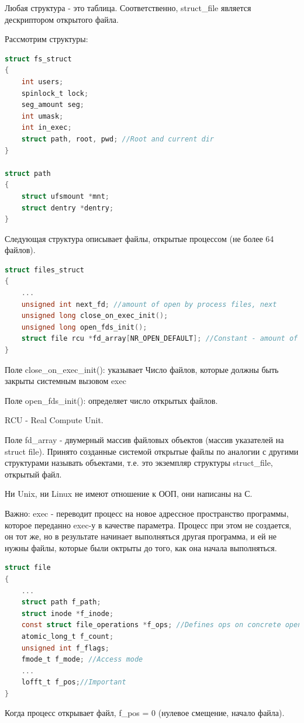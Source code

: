 \documentclass[12pt,a4paper]{scrreprt}
\begin{document}
Любая структура - это таблица. Соответственно, struct\_file является дескриптором открытого файла.

Рассмотрим структуры:

\begin{lstlisting}[language=C]
struct fs_struct
{
	int users;
	spinlock_t lock;
	seg_amount seg;
	int umask;
	int in_exec;
	struct path, root, pwd; //Root and current dir
}

struct path 
{
	struct ufsmount *mnt;
	struct dentry *dentry;
}
\end{lstlisting}

Следующая структура описывает файлы, открытые процессом (не более 64 файлов).
\begin{lstlisting}[language=C]
struct files_struct
{
	...
	unsigned int next_fd; //amount of open by process files, next
	unsigned long close_on_exec_init();
	unsigned long open_fds_init();
	struct file rcu *fd_array[NR_OPEN_DEFAULT]; //Constant - amount of open files
}
\end{lstlisting}

Поле close\_on\_exec\_init(): указывает Число файлов, которые должны быть закрыты системным вызовом exec
 
Поле open\_fds\_init(): определяет число открытых файлов.

RCU - Real Compute Unit. 

Поле fd\_array - двумерный массив файловых объектов (массив указателей на struct file). Принято созданные системой открытые файлы по аналогии с другими структурами называть объектами, т.е. это экземпляр структуры struct\_file, открытый файл.

Ни Unix, ни Linux не имеют отношение к ООП, они написаны на С.

Важно: exec - переводит процесс на новое адрессное пространство программы, которое переданно exec-у в качестве параметра. Процесс при этом не создается, он тот же, но в результате начинает выполняться другая программа, и ей не нужны файлы, которые были октрыты до того, как она начала выполняться.

\begin{lstlisting}[language=C]
struct file
{
	...
	struct path f_path;
	struct inode *f_inode;
	const struct file_operations *f_ops; //Defines ops on concrete open file.
	atomic_long_t f_count;
	unsigned int f_flags;
	fmode_t f_mode; //Access mode
	...
	lofft_t f_pos;//Important
}
\end{lstlisting}

Когда процесс открывает файл, f\_pos = 0 (нулевое смещение, начало файла).
\end{document}
